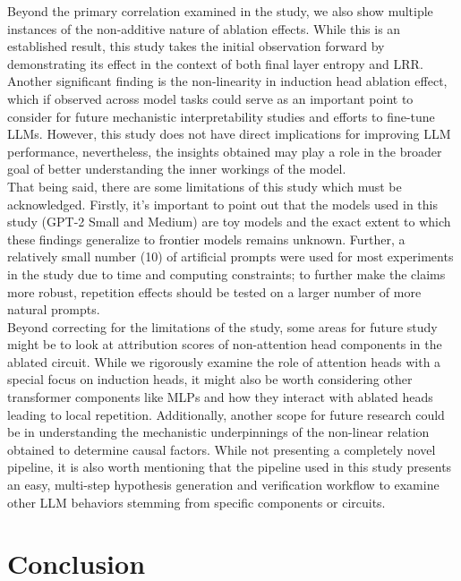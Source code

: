 \documentclass[twocolumn]{article}
\begin{document}
Beyond the primary correlation examined in the study, we also show multiple instances of the non-additive nature of ablation effects. While this is an established result, this study takes the initial observation forward by demonstrating its effect in the context of both final layer entropy and LRR. Another significant finding is the non-linearity in induction head ablation effect, which if observed across model tasks could serve as an important point to consider for future mechanistic interpretability studies and efforts to fine-tune LLMs. However, this study does not have direct implications for improving LLM performance, nevertheless, the insights obtained may play a role in the broader goal of better understanding the inner workings of the model. \\

That being said, there are some limitations of this study which must be acknowledged. Firstly, it's important to point out that the models used in this study (GPT-2 Small and Medium) are toy models and the exact extent to which these findings generalize to frontier models remains unknown. Further, a relatively small number (10) of artificial prompts were used for most experiments in the study due to time and computing constraints; to further make the claims more robust, repetition effects should be tested on a larger number of more natural prompts. \\

Beyond correcting for the limitations of the study, some areas for future study might be to look at attribution scores of non-attention head components in the ablated circuit. While we rigorously examine the role of attention heads with a special focus on induction heads, it might also be worth considering other transformer components like MLPs and how they interact with ablated heads leading to local repetition. Additionally, another scope for future research could be in understanding the mechanistic underpinnings of the non-linear relation obtained to determine causal factors. While not presenting a completely novel pipeline, it is also worth mentioning that the pipeline used in this study presents an easy, multi-step hypothesis generation and verification workflow to examine other LLM behaviors stemming from specific components or circuits.

\section{Conclusion}
\end{document}
